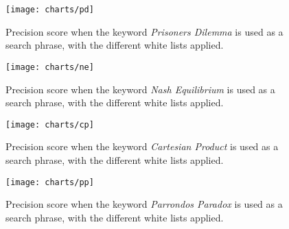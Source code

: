 \begin{figure}[h] 
\caption{Precision score when the keyword \textit{Prisoners Dilemma} is used as a search phrase, with the different white lists applied.}
\texttt{[image: charts/pd]}
\label{fig:pd}
\end{figure}

\begin{figure}[h] 
\caption{Precision score when the keyword \textit{Nash Equilibrium} is used as a search phrase, with the different white lists applied.}
\texttt{[image: charts/ne]}
\label{fig:ne}
\end{figure}

\begin{figure}[h] 
\caption{Precision score when the keyword \textit{Cartesian Product} is used as a search phrase, with the different white lists applied.}
\texttt{[image: charts/cp]}
\label{fig:cp}
\end{figure}

\begin{figure}[h] 
\caption{Precision score when the keyword \textit{Parrondos Paradox} is used as a search phrase, with the different white lists applied.}
\texttt{[image: charts/pp]}
\label{fig:pp}
\end{figure}




